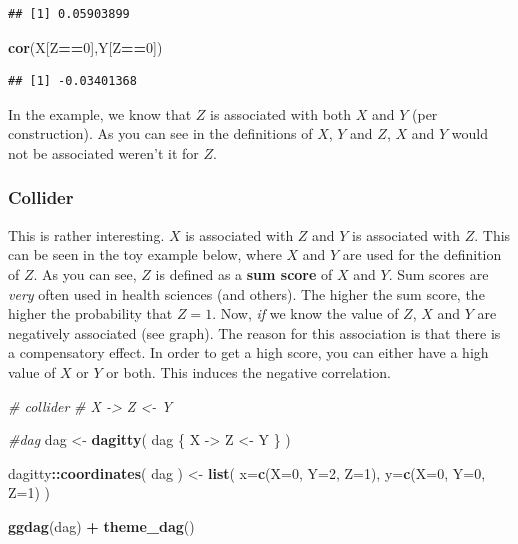\documentclass[
]{book}
\newenvironment{Shaded}{\begin{snugshade}}{\end{snugshade}}
\newcommand{\AttributeTok}[1]{\textcolor[rgb]{0.13,0.29,0.53}{#1}}
\newcommand{\CommentTok}[1]{\textcolor[rgb]{0.56,0.35,0.01}{\textit{#1}}}
\newcommand{\DecValTok}[1]{\textcolor[rgb]{0.00,0.00,0.81}{#1}}
\newcommand{\FunctionTok}[1]{\textcolor[rgb]{0.13,0.29,0.53}{\textbf{#1}}}
\newcommand{\NormalTok}[1]{#1}
\newcommand{\OtherTok}[1]{\textcolor[rgb]{0.56,0.35,0.01}{#1}}
\newcommand{\SpecialCharTok}[1]{\textcolor[rgb]{0.81,0.36,0.00}{\textbf{#1}}}
\newcommand{\StringTok}[1]{\textcolor[rgb]{0.31,0.60,0.02}{#1}}
\begin{document}
\begin{verbatim}
## [1] 0.05903899
\end{verbatim}

\begin{Shaded}
\begin{Highlighting}[]
\FunctionTok{cor}\NormalTok{(X[Z}\SpecialCharTok{==}\DecValTok{0}\NormalTok{],Y[Z}\SpecialCharTok{==}\DecValTok{0}\NormalTok{])}
\end{Highlighting}
\end{Shaded}

\begin{verbatim}
## [1] -0.03401368
\end{verbatim}

In the example, we know that \(Z\) is associated with both \(X\) and \(Y\) (per construction).
As you can see in the definitions of \(X\), \(Y\) and \(Z\), \(X\) and \(Y\) would not be associated
weren't it for \(Z\).

\subsubsection{Collider}\label{collider}

This is rather interesting. \(X\) is associated with \(Z\) and \(Y\) is associated
with \(Z\). This can be seen in the toy example below, where \(X\) and \(Y\) are used
for the definition of \(Z\). As you can see, \(Z\) is defined as a \textbf{sum
score} of \(X\) and \(Y\). Sum scores are \emph{very} often used in health sciences (and others).
The higher the sum score, the higher the probability that \(Z=1\).
Now, \emph{if} we know the value of \(Z\), \(X\) and \(Y\) are negatively associated (see graph).
The reason for this association is that there is a compensatory effect. In order to get a high
score, you can either have a high value of \(X\) or \(Y\) or both.
This induces the negative correlation.

\begin{Shaded}
\begin{Highlighting}[]
\CommentTok{\# collider}
\CommentTok{\# X {-}\textgreater{} Z \textless{}{-} Y}

\CommentTok{\#dag}
\NormalTok{dag }\OtherTok{\textless{}{-}} \FunctionTok{dagitty}\NormalTok{( }\StringTok{\textquotesingle{}dag \{}
\StringTok{  X {-}\textgreater{} Z \textless{}{-} Y}
\StringTok{\}\textquotesingle{}}\NormalTok{ )}

\NormalTok{dagitty}\SpecialCharTok{::}\FunctionTok{coordinates}\NormalTok{( dag ) }\OtherTok{\textless{}{-}}
  \FunctionTok{list}\NormalTok{( }\AttributeTok{x=}\FunctionTok{c}\NormalTok{(}\AttributeTok{X=}\DecValTok{0}\NormalTok{, }\AttributeTok{Y=}\DecValTok{2}\NormalTok{, }\AttributeTok{Z=}\DecValTok{1}\NormalTok{),}
        \AttributeTok{y=}\FunctionTok{c}\NormalTok{(}\AttributeTok{X=}\DecValTok{0}\NormalTok{, }\AttributeTok{Y=}\DecValTok{0}\NormalTok{, }\AttributeTok{Z=}\DecValTok{1}\NormalTok{) )}

\FunctionTok{ggdag}\NormalTok{(dag) }\SpecialCharTok{+} \FunctionTok{theme\_dag}\NormalTok{()}
\end{Highlighting}
\end{Shaded}
\end{document}
